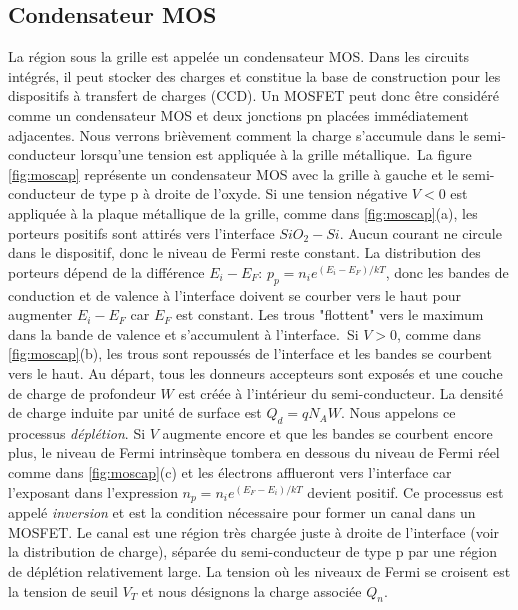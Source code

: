 \subsection{Condensateur MOS}
La région sous la grille est appelée un condensateur MOS. Dans les circuits intégrés, il peut stocker des charges et constitue la base de construction pour les dispositifs à transfert de charges (CCD). Un MOSFET peut donc être considéré comme un condensateur MOS et deux jonctions pn placées immédiatement adjacentes. Nous verrons brièvement comment la charge s'accumule dans le semi-conducteur lorsqu'une tension est appliquée à la grille métallique.\
La figure \ref{fig:moscap} représente un condensateur MOS avec la grille à gauche et le semi-conducteur de type p à droite de l'oxyde. Si une tension négative $V < 0$ est appliquée à la plaque métallique de la grille, comme dans \ref{fig:moscap}(a), les porteurs positifs sont attirés vers l'interface $SiO_2 - Si$. Aucun courant ne circule dans le dispositif, donc le niveau de Fermi reste constant. La distribution des porteurs dépend de la différence $E_i - E_F$: $p_p = n_i e^{(E_i - E_F)/kT}$, donc les bandes de conduction et de valence à l'interface doivent se courber vers le haut pour augmenter $E_i - E_F$ car $E_F$ est constant. Les trous "flottent" vers le maximum dans la bande de valence et s'accumulent à l'interface.\
Si $V > 0$, comme dans \ref{fig:moscap}(b), les trous sont repoussés de l'interface et les bandes se courbent vers le haut. Au départ, tous les donneurs accepteurs sont exposés et une couche de charge de profondeur $W$ est créée à l'intérieur du semi-conducteur. La densité de charge induite par unité de surface est $Q_d = q N_A W$. Nous appelons ce processus \emph{déplétion}. Si $V$ augmente encore et que les bandes se courbent encore plus, le niveau de Fermi intrinsèque tombera en dessous du niveau de Fermi réel comme dans \ref{fig:moscap}(c) et les électrons afflueront vers l'interface car l'exposant dans l'expression $n_p = n_i e^{(E_F - E_i)/kT}$ devient positif. Ce processus est appelé \emph{inversion} et est la condition nécessaire pour former un canal dans un MOSFET. Le canal est une région très chargée juste à droite de l'interface (voir la distribution de charge), séparée du semi-conducteur de type p par une région de déplétion relativement large. La tension où les niveaux de Fermi se croisent est la tension de seuil $V_T$ et nous désignons la charge associée $Q_n$.

